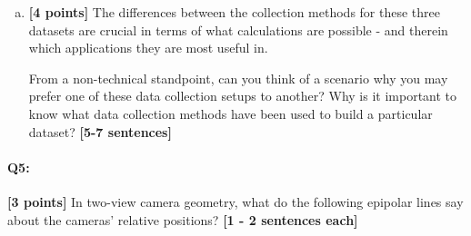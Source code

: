 \begin{enumerate}[(a)]
\pagebreak
\item \textbf{[4 points]}
The differences between the collection methods for these three datasets are crucial in terms of what calculations are possible - and therein which applications they are most useful in.
\begin{tcolorbox}[colback=orange!5!white,colframe=orange!75!black] 
 From a non-technical standpoint, can you think of a scenario why you may prefer one of these data collection setups to another? Why is it important to know what data collection methods have been used to build a particular dataset? \textbf{[5-7 sentences]}
\end{tcolorbox}
\end{enumerate}











\pagebreak
\paragraph{Q5:} \textbf{[3 points]} In two-view camera geometry, what do the following epipolar lines say about the cameras' relative positions? \textbf{[1 - 2 sentences each]}

